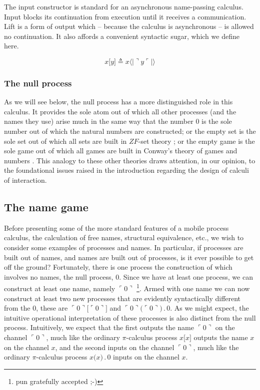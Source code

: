 \documentclass[]{amsart}
\newcommand{\lliftb}{\langle\!|}
\newcommand{\rliftb}{|\!\rangle}
\newcommand{\lpquote}{\ulcorner}
\newcommand{\rpquote}{\urcorner}
\newcommand{\id}[1]{\texttt{#1}}
\newcommand{\concat}{\mathbin{.}}
\newcommand{\lift}[2]{#1 \lliftb #2 \rliftb}
\newcommand{\quotep}[1]{\lpquote #1 \rpquote}
\newcommand{\dropn}[1]{\rpquote #1 \lpquote}
\theoremstyle{definition}
\theoremstyle{remark}
\numberwithin{equation}{subsection}
\newcommand{\pic}{$\pi$-calculus}
\begin{document}
The input constructor is standard for an asynchronous name-passing
calculus. Input blocks its continuation from execution until it
receives a communication. Lift is a form of output which -- because
the calculus is asynchronous -- is allowed no continuation. It also
affords a convenient syntactic sugar, which we define here.

\begin{equation*}
	{x}\id{[}{y}\id{]} \triangleq \lift{x}{\dropn{y}}
\end{equation*}

\subsubsection{The null process}

As we will see below, the null process has a more distinguished role
in this calculus. It provides the sole atom out of which all other
processes (and the names they use) arise much in the same way that the
number $0$ is the sole number out of which the natural numbers are
constructed; or the empty set is the sole set out of which all sets
are built in $ZF$-set theory \cite{Krivine-TheCurryHowardCorre}; or
the empty game is the sole game out of which all games are built in
Conway's theory of games and numbers \cite{ONAG}. This analogy to
these other theories draws attention, in our opinion, to the
foundational issues raised in the introduction regarding the design of
calculi of interaction.

\subsection{The name game}

Before presenting some of the more standard features of a mobile
process calculus, the calculation of free names, structural
equivalence, etc., we wish to consider some examples of processes and
names. In particular, if processes are built out of names, and names
are built out of processes, is it ever possible to get off the ground?
Fortunately, there is one process the construction of which involves
no names, the null process, $0$. Since we have at least one process,
we can construct at least one name, namely $\quotep{0}$ \footnote{pun
gratefully accepted ;-)}. Armed with one name we can now construct at
least two new processes that are evidently syntactically different
from the $0$, these are $\quotep{0}\id{[}{\quotep{0}}\id{]}$ and
$\quotep{0}\id{(}{\quotep{0}}\id{)} \concat 0$. As we might expect,
the intuitive operational interpretation of these processes is also
distinct from the null process. Intuitively, we expect that the first
outputs the name $\quotep{0}$ on the channel $\quotep{0}$, much like
the ordinary {\pic} process $x\id{[}x\id{]}$ outputs the name $x$ on
the channel $x$, and the second inputs on the channel $\quotep{0}$,
much like the ordinary {\pic} process $x\id{(}x\id{)} \concat 0$
inputs on the channel $x$.
\end{document}
